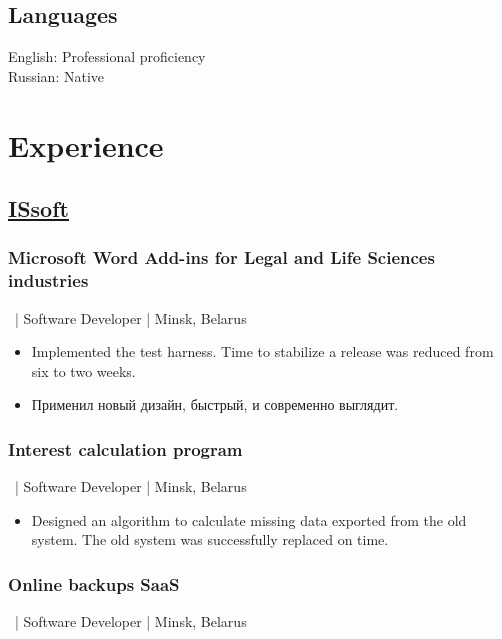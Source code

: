 \documentclass[a4paper]{article}
\newcommand{\periodandlocation}[1]{{\small #1}}
\begin{document}
\begin{minipage}[t]{0.34\textwidth}
    \subsection*{Languages}
    English: Professional proficiency\\
    Russian: Native
  \end{minipage}
  \hfil
  \begin{minipage}[t]{0.55\textwidth}
    \section*{Experience}
    \subsection*{\href{http://www.issoft.by/}{ISsoft}}
	\subsubsection*{Microsoft Word Add-ins for Legal and Life Sciences industries}
    \periodandlocation{\ | Software Developer | Minsk, Belarus}
	\begin{otherlanguage}{russian}
      \begin{itemize}
        \item Implemented the test harness. Time to stabilize a release was reduced from six to two weeks.
        \item Применил новый дизайн, быстрый, и современно выглядит.
      \end{itemize}
	\end{otherlanguage}
	\subsubsection*{Interest calculation program}
    \periodandlocation{\ | Software Developer | Minsk, Belarus}
	\begin{itemize}
      \item Designed an algorithm to calculate missing data exported from the old system. The old system was successfully replaced on time.
    \end{itemize}
	\subsubsection*{Online backups SaaS}
	\periodandlocation{\ | Software Developer | Minsk, Belarus}

\end{minipage}
\end{document}
